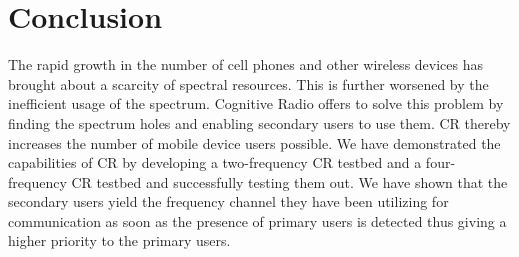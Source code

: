 \chapter{Conclusion}

The rapid growth in the number of cell phones and other wireless devices has 
brought about a scarcity of spectral resources. This is further worsened by the
inefficient usage of the spectrum. Cognitive Radio offers to solve this problem
by finding the spectrum holes and enabling secondary users to use them. CR 
thereby increases the number of mobile device users possible. We have 
demonstrated the capabilities of CR by developing a two-frequency CR testbed and
a four-frequency CR testbed and successfully testing them out.  We have shown
that the secondary users yield the frequency channel they have been utilizing
for communication as soon as the presence of primary users is detected thus
giving a higher priority to the primary users.
